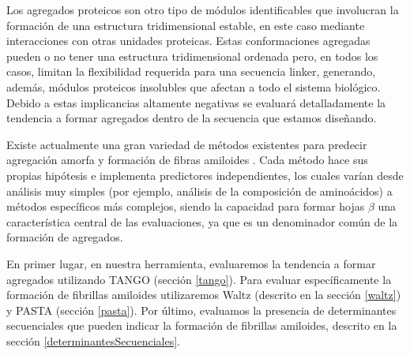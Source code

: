 Los agregados proteicos son otro tipo de módulos identificables que involucran la formación de una estructura tridimensional estable, en este caso mediante interacciones con otras unidades proteicas.
Estas conformaciones agregadas pueden o no tener una estructura tridimensional ordenada pero, en todos los casos, limitan la flexibilidad requerida para una secuencia linker, generando, además,
módulos proteicos insolubles que afectan a todo el sistema biológico.
Debido a estas implicancias altamente negativas se evaluará detalladamente la tendencia a formar agregados dentro de la secuencia que estamos diseñando.
 

Existe actualmente una gran variedad de métodos existentes para predecir agregación amorfa y formación de fibras amiloides \cite{hamodrakas2011protein,redler2014computational,agrawal2011aggregation}.
Cada método hace sus propias hipótesis e implementa predictores independientes, los cuales varían desde análisis muy simples (por ejemplo, análisis de la composición de aminoácidos) a métodos específicos más complejos, siendo 
la capacidad para formar hojas $\beta$ una característica central de las evaluaciones, ya que es un denominador común de la formación de agregados.

En primer lugar, en nuestra herramienta, evaluaremos la tendencia a formar agregados utilizando TANGO (sección \ref{tango}). 
Para evaluar específicamente la formación de fibrillas amiloides utilizaremos Waltz (descrito en la sección \ref{waltz}) y PASTA (sección \ref{pasta}).
Por último, evaluamos la presencia de determinantes secuenciales que pueden indicar la formación de fibrillas amiloides, descrito en la sección \ref{determinantesSecuenciales}.



















